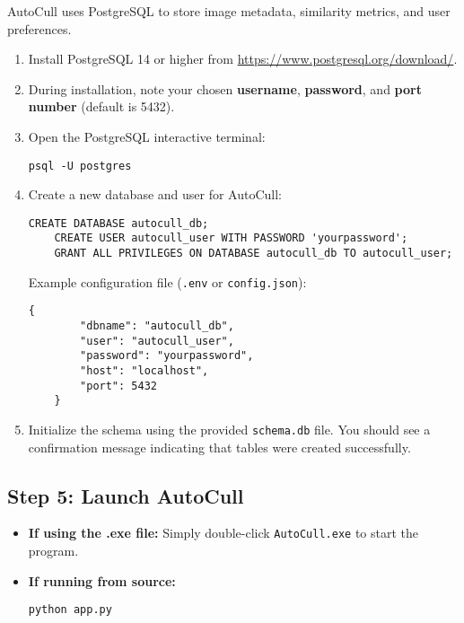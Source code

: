 \documentclass[12pt,a4paper]{article}
\begin{document}
AutoCull uses PostgreSQL to store image metadata, similarity metrics, and user preferences.

\begin{enumerate}[label=\arabic*.]
    \item Install PostgreSQL 14 or higher from \url{https://www.postgresql.org/download/}.
    \item During installation, note your chosen \textbf{username}, \textbf{password}, and \textbf{port number} (default is 5432).
    \item Open the PostgreSQL interactive terminal:
    \begin{lstlisting}[style=console]
    psql -U postgres
    \end{lstlisting}
    \item Create a new database and user for AutoCull:
    \begin{lstlisting}[style=console]
    CREATE DATABASE autocull_db;
    CREATE USER autocull_user WITH PASSWORD 'yourpassword';
    GRANT ALL PRIVILEGES ON DATABASE autocull_db TO autocull_user;
    \end{lstlisting}

    Example configuration file (\texttt{.env} or \texttt{config.json}):
    \begin{lstlisting}[style=console]
    {
        "dbname": "autocull_db",
        "user": "autocull_user",
        "password": "yourpassword",
        "host": "localhost",
        "port": 5432
    }
    \end{lstlisting}
    \item Initialize the schema using the provided \texttt{schema.db} file.  
    You should see a confirmation message indicating that tables were created successfully.
\end{enumerate}

\subsection{Step 5: Launch AutoCull}

\begin{itemize}
    \item \textbf{If using the .exe file:}  
    Simply double-click \texttt{AutoCull.exe} to start the program.
    \item \textbf{If running from source:}
    \begin{lstlisting}[style=console]
    python app.py
    \end{lstlisting}
\end{itemize}
\end{document}
